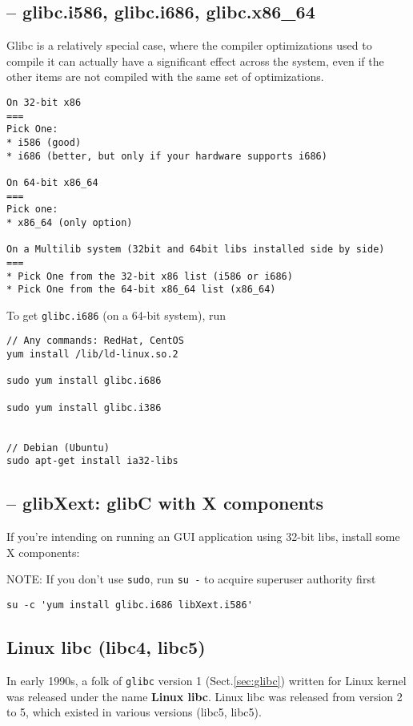 \subsection{-- glibc.i586, glibc.i686, glibc.x86\_64}

Glibc is a relatively special case, where the compiler optimizations
used to compile it can actually have a significant effect across the
system, even if the other items are not compiled with the same set of
optimizations.


\begin{verbatim}
On 32-bit x86
===
Pick One:
* i586 (good)
* i686 (better, but only if your hardware supports i686)

On 64-bit x86_64
===
Pick one:
* x86_64 (only option)

On a Multilib system (32bit and 64bit libs installed side by side)
===
* Pick One from the 32-bit x86 list (i586 or i686)
* Pick One from the 64-bit x86_64 list (x86_64)
\end{verbatim}

To get \verb!glibc.i686! (on a 64-bit system), run
\begin{verbatim}
// Any commands: RedHat, CentOS
yum install /lib/ld-linux.so.2

sudo yum install glibc.i686

sudo yum install glibc.i386


// Debian (Ubuntu)
sudo apt-get install ia32-libs
\end{verbatim}

\subsection{-- glibXext: glibC with X components}
\label{sec:glibXext}

If you're intending on running an GUI application using 32-bit libs, install
some X components:

NOTE: If you don't use \verb!sudo!, run \verb!su -! to acquire superuser
authority first
\begin{verbatim}
su -c 'yum install glibc.i686 libXext.i586'
\end{verbatim}

\subsection{Linux libc (libc4, libc5)}
\label{sec:libc}
\label{sec:Linux-libc}

In early 1990s, a folk of \verb!glibc! version 1 (Sect.\ref{sec:glibc}) written
for Linux kernel was released under the name {\bf Linux libc}. Linux libc was
released from version 2 to 5, which existed in  various versions (libc5, libc5).

